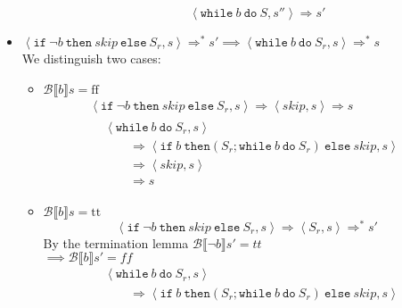 \begin{exercise}
\begin{itemize}
\begin{itemize}
\begin{itemize}
                    \[ \left<\texttt{while}\ b\ \texttt{do}\ S, s''\right> \Rightarrow s' \]
                \end{itemize}
            \end{itemize}
        \item $\left<\texttt{if}\ \neg b\ \texttt{then}\ skip\ \texttt{else}\ S_r, s\right> \Rightarrow^* s' \implies \left<\texttt{while}\ b\ \texttt{do}\ S_r, s\right> \Rightarrow^* s$ \\
            We distinguish two cases:
            \begin{itemize}
                \item $\mathcal{B} \llbracket b \rrbracket s = \text{ff}$
                \begin{gather*}
                    \left<\texttt{if}\ \neg b\ \texttt{then}\ skip\ \texttt{else}\ S_r, s\right>
                    \Rightarrow
                    \left<skip, s\right>
                    \Rightarrow s
                    \\
                    \begin{align*}
                        &\left<\texttt{while}\ b\ \texttt{do}\ S_r, s\right>
                        \\&\qquad\Rightarrow \left<\texttt{if}\ b\ \texttt{then} (S_r; \texttt{while}\ b\ \texttt{do}\ S_r)\ \texttt{else}\ skip, s\right>
                        \\&\qquad\Rightarrow \left<skip, s\right>
                        \\&\qquad\Rightarrow s
                    \end{align*}
                \end{gather*}
                \item $\mathcal{B} \llbracket b \rrbracket s = \text{tt}$
                \[
                    \left<\texttt{if}\ \neg b\ \texttt{then}\ skip\ \texttt{else}\ S_r, s\right>
                    \Rightarrow
                    \left<S_r, s\right>
                    \Rightarrow^* s'
                \]
                By the termination lemma $\mathcal{B} \llbracket \neg b \rrbracket s' = tt$ \\
                $\implies \mathcal{B} \llbracket b \rrbracket s' = ff$
                \begin{align*}
                    &\left<\texttt{while}\ b\ \texttt{do}\ S_r, s\right>
                    \\&\qquad\Rightarrow \left<\texttt{if}\ b\ \texttt{then} (S_r; \texttt{while}\ b\ \texttt{do}\ S_r)\ \texttt{else}\ skip, s\right>

\end{align*}
\end{itemize}
\end{itemize}
\end{exercise}
